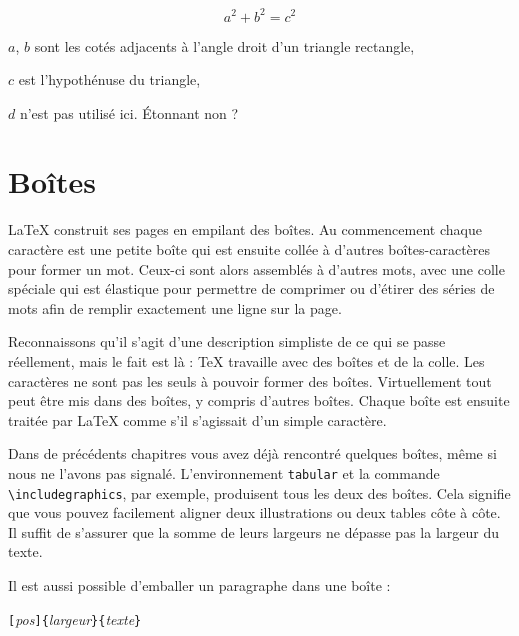 \begin{example}
\flushleft
\newenvironment{vardesc}[1]{%
  \settowidth{\parindent}{#1\ }
  \makebox[0pt][r]{#1\ }}{}
\begin{displaymath}
a^2+b^2=c^2
\end{displaymath}

\begin{vardesc}{Où :}$a$, 
$b$ sont les cotés adjacents à
l'angle droit d'un triangle 
rectangle,\par
$c$ est l'hypothénuse du 
triangle,\par
$d$ n'est pas utilisé ici. 
\'Etonnant non ?
\end{vardesc}
\end{example}


\section{Boîtes}

\LaTeX{} construit ses pages en empilant des boîtes. Au commencement
chaque caractère est une petite boîte qui est ensuite collée à
d'autres boîtes-caractères pour former un mot. Ceux-ci sont alors
assemblés à d'autres mots, avec une colle spéciale qui est élastique
pour permettre de comprimer ou d'étirer des séries de mots afin de
remplir exactement une ligne sur la page.

Reconnaissons qu'il s'agit d'une description simpliste de ce
qui se passe réellement, mais le fait est là : \TeX{} travaille avec
des boîtes et de la colle. Les caractères ne sont pas les seuls à
pouvoir former des boîtes. Virtuellement tout peut être mis dans des
boîtes, y compris d'autres boîtes. Chaque boîte est ensuite traitée
par \LaTeX{} comme s'il s'agissait d'un simple caractère. 

Dans de précédents chapitres vous avez déjà rencontré quelques
boîtes, même si nous ne l'avons pas signalé. L'environnement
\verb|tabular| et la commande \verb|\includegraphics|, par exemple,
produisent tous les deux des boîtes. Cela signifie que vous pouvez
facilement aligner deux illustrations ou deux tables côte à côte. Il
suffit de s'assurer que la somme de leurs largeurs ne dépasse pas la
largeur du texte.

Il est aussi possible d'emballer un paragraphe dans une boîte  :
\begin{lscommand}
\verb|[|\emph{pos}\verb|]{|\emph{largeur}\verb|}{|\emph{texte}\verb|}|
\end{lscommand}

